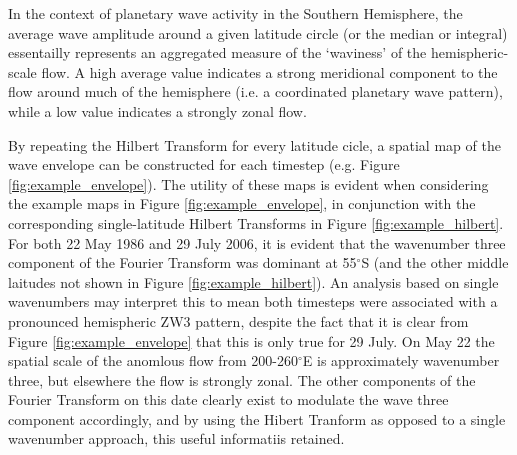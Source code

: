 In the context of planetary wave activity in the Southern Hemisphere, the average wave amplitude around a given latitude circle (or the median or integral) essentailly represents an aggregated measure of the `waviness' of the hemispheric-scale flow. A high average value indicates a strong meridional component to the flow around much of the hemisphere (i.e. a coordinated planetary wave pattern), while a low value indicates a strongly zonal flow. 

By repeating the Hilbert Transform for every latitude cicle, a spatial map of the wave envelope can be constructed for each timestep (e.g. Figure \ref{fig:example_envelope}). The utility of these maps is evident when considering the example maps in Figure \ref{fig:example_envelope}, in conjunction with the corresponding single-latitude Hilbert Transforms in Figure \ref{fig:example_hilbert}. For both 22 May 1986 and 29 July 2006, it is evident that the wavenumber three component of the Fourier Transform was dominant at 55$^{\circ}$S (and the other middle laitudes not shown in Figure \ref{fig:example_hilbert}). An analysis based on single wavenumbers may interpret this to mean both timesteps were associated with a pronounced hemispheric ZW3 pattern, despite the fact that it is clear from Figure \ref{fig:example_envelope} that this is only true for 29 July. On May 22 the spatial scale of the anomlous flow from 200-260$^{\circ}$E is approximately wavenumber three, but elsewhere the flow is strongly zonal. The other components of the Fourier Transform on this date clearly exist to modulate the wave three component accordingly, and by using the Hibert Tranform as opposed to a single wavenumber approach, this useful informatiis retained.
